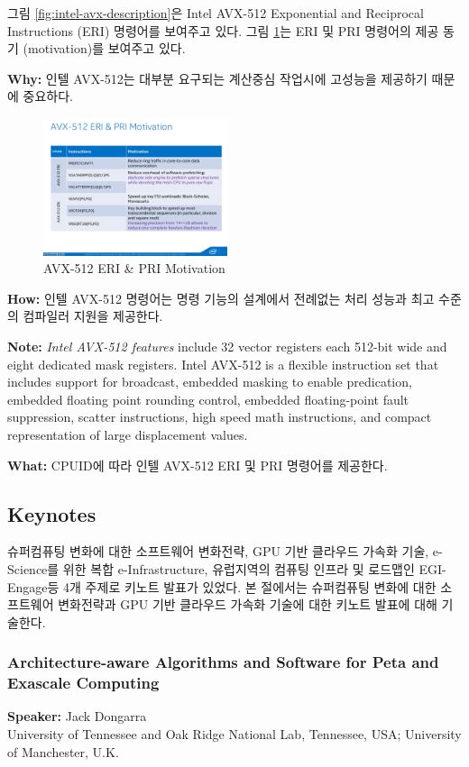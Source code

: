 \documentclass[twocolumn]{article}
\begin{document}
그림 \ref{fig:intel-avx-description}은 Intel AVX-512 Exponential and Reciprocal Instructions (ERI) 명령어를 보여주고 있다. 그림 \ref{fig:intel-avx-512}는 ERI 및 PRI 명령어의 제공 동기 (motivation)를 보여주고 있다.

\noindent
\textbf{Why:} 
인텔 AVX-512는 대부분 요구되는 계산중심 작업시에 고성능을 제공하기 때문에 중요하다.

\begin{figure}[htb]
        \centering
        \includegraphics[width=0.48\textwidth]{intel-avx-512.pdf}
        \caption{AVX-512 ERI \& PRI Motivation}
        \label{fig:intel-avx-512}
\end{figure}

\noindent
\textbf{How:} 인텔 AVX-512 명령어는 명령 기능의 설계에서 전례없는 처리 성능과 최고 수준의 컴파일러 지원을 제공한다.

\noindent
\textbf{Note:} \textit{Intel AVX-512 features} include 32 vector registers each 512-bit wide and eight dedicated mask registers. Intel AVX-512 is a flexible instruction set that includes support for broadcast, embedded masking to enable predication, embedded floating point rounding control, embedded floating-point fault suppression, scatter instructions, high speed math instructions, and compact representation of large displacement values.

\noindent
\textbf{What:} CPUID에 따라 인텔 AVX-512 ERI 및 PRI 명령어를 제공한다.

\subsection{Keynotes}
슈퍼컴퓨팅 변화에 대한 소프트웨어 변화전략, GPU 기반 클라우드 가속화 기술, e-Science를 위한 복합 e-Infrastructure, 유럽지역의 컴퓨팅 인프라 및 로드맵인  EGI-Engage등 4개 주제로 키노트 발표가 있었다. 본 절에서는 슈퍼컴퓨팅 변화에 대한 소프트웨어 변화전략과 GPU 기반 클라우드 가속화 기술에 대한 키노트 발표에 대해 기술한다.

\subsubsection{Architecture-aware Algorithms and Software for Peta and Exascale Computing}
\textbf{Speaker:} Jack Dongarra\\
University of Tennessee and Oak Ridge National Lab, Tennessee, USA; University of Manchester, U.K.
\end{document}
